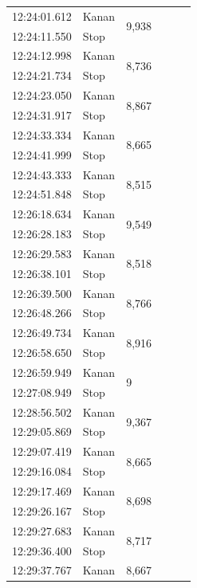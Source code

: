 \begin{longtable}{|l|l|l|l|l|l|}
  \hline
  12:24:01.612 & Kanan & \multirow{2}{*}{9,938} \\
  \cline{1-2}
  12:24:11.550 & Stop & \\
  \hline
  12:24:12.998 & Kanan & \multirow{2}{*}{8,736} \\
  \cline{1-2}
  12:24:21.734 & Stop & \\
  \hline
  12:24:23.050 & Kanan & \multirow{2}{*}{8,867} \\
  \cline{1-2}
  12:24:31.917 & Stop & \\
  \hline
  12:24:33.334 & Kanan & \multirow{2}{*}{8,665} \\
  \cline{1-2}
  12:24:41.999 & Stop & \\
  \hline
  12:24:43.333 & Kanan & \multirow{2}{*}{8,515} \\
  \cline{1-2}
  12:24:51.848 & Stop & \\
  \hline
  12:26:18.634 & Kanan & \multirow{2}{*}{9,549} \\
  \cline{1-2}
  12:26:28.183 & Stop & \\
  \hline
  12:26:29.583 & Kanan & \multirow{2}{*}{8,518} \\
  \cline{1-2}
  12:26:38.101 & Stop & \\
  \hline
  12:26:39.500 & Kanan & \multirow{2}{*}{8,766} \\
  \cline{1-2}
  12:26:48.266 & Stop & \\
  \hline
  12:26:49.734 & Kanan & \multirow{2}{*}{8,916} \\
  \cline{1-2}
  12:26:58.650 & Stop & \\
  \hline
  12:26:59.949 & Kanan & \multirow{2}{*}{9} \\
  \cline{1-2}
  12:27:08.949 & Stop & \\
  \hline
  12:28:56.502 & Kanan & \multirow{2}{*}{9,367} \\
  \cline{1-2}
  12:29:05.869 & Stop & \\
  \hline
  12:29:07.419 & Kanan & \multirow{2}{*}{8,665} \\
  \cline{1-2}
  12:29:16.084 & Stop & \\
  \hline
  12:29:17.469 & Kanan & \multirow{2}{*}{8,698} \\
  \cline{1-2}
  12:29:26.167 & Stop & \\
  \hline
  12:29:27.683 & Kanan & \multirow{2}{*}{8,717} \\
  \cline{1-2}
  12:29:36.400 & Stop & \\
  \hline
  12:29:37.767 & Kanan & \multirow{2}{*}{8,667} \\

\end{longtable}
